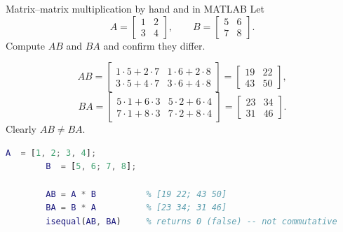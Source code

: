 \begin{examplebox}{Matrix--matrix multiplication by hand and in MATLAB}
	Let
	\[
	A = \begin{bmatrix} 1 & 2 \\ 3 & 4 \end{bmatrix},
	\qquad
	B = \begin{bmatrix} 5 & 6 \\ 7 & 8 \end{bmatrix}.
	\]
	Compute $AB$ and $BA$ and confirm they differ.
	
	\solution
	\[
	AB =
	\begin{bmatrix}
		1\cdot5 + 2\cdot7 & 1\cdot6 + 2\cdot8 \\
		3\cdot5 + 4\cdot7 & 3\cdot6 + 4\cdot8
	\end{bmatrix}
	=
	\begin{bmatrix} 19 & 22 \\ 43 & 50 \end{bmatrix},
	\]
	\[
	BA =
	\begin{bmatrix}
		5\cdot1 + 6\cdot3 & 5\cdot2 + 6\cdot4 \\
		7\cdot1 + 8\cdot3 & 7\cdot2 + 8\cdot4
	\end{bmatrix}
	=
	\begin{bmatrix} 23 & 34 \\ 31 & 46 \end{bmatrix}.
	\]
	Clearly $AB \neq BA$.
	
	\begin{lstlisting}[language=Matlab]
		A  = [1, 2; 3, 4];
		B  = [5, 6; 7, 8];
		
		AB = A * B          % [19 22; 43 50]
		BA = B * A          % [23 34; 31 46]
		isequal(AB, BA)     % returns 0 (false) -- not commutative
	\end{lstlisting}
\end{examplebox}

